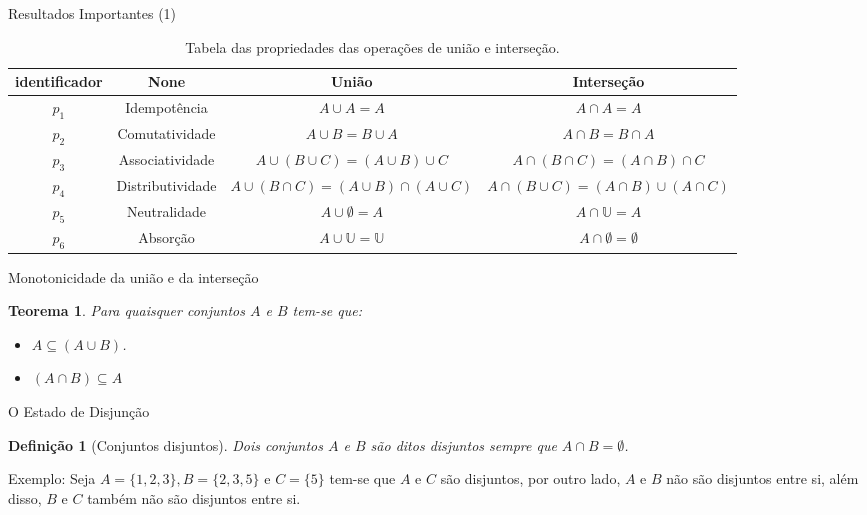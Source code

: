 \documentclass[aspectratio=169]{beamer}
\newtheorem{defi}{Definição}
\newtheorem{teo}{Teorema}
\begin{document}
	\begin{frame}{Resultados Importantes (1)}
		\begin{table}[h]
			\centering
			\scriptsize
			\begin{tabular}{cccc}
				\hline
				identificador & None & União & Interseção  \\
				\hline
				$p_1$ & Idempotência &  $A \cup A = A$ & $A \cap A = A$  \\
				$p_2$ & Comutatividade & $A \cup B = B \cup A$ & $A \cap B = B \cap A$ \\
				$p_3$ & Associatividade & $A \cup (B \cup C) = (A \cup B) \cup C$ & $A \cap (B \cap C) = (A \cap B) \cap C$ \\
				$p_4$ & Distributividade & $A \cup (B \cap C) = (A \cup B) \cap (A \cup C)$ & $A \cap (B \cup C) = (A \cap B) \cup (A \cap C)$\\
				$p_5$ & Neutralidade &  $A \cup \emptyset = A$ & $A \cap \mathbb{U} = A$ \\
				$p_6$ & Absorção & $A \cup \mathbb{U} = \mathbb{U}$ & $A \cap \emptyset = \emptyset$ \\
				\hline
			\end{tabular}
			\caption{Tabela das propriedades das operações de união e interseção.}
			\label{tab:PropriedadesUniaoIntersecao}
		\end{table}
	\end{frame}

	\begin{frame}{Monotonicidade da união e da interseção}
		\begin{teo}\label{teo:MonotonicidadeDaUniaoIntersecao}
			Para quaisquer conjuntos $A$ e $B$ tem-se que:
			\begin{itemize}
				\item[i.] $A \subseteq (A \cup B)$.
				\item[ii.] $(A \cap B) \subseteq A$
			\end{itemize}
		\end{teo}
	\end{frame}

	\begin{frame}{O Estado de Disjunção}
		\begin{defi}[Conjuntos disjuntos]\label{def:ConjuntosDisjuntos}
			Dois conjuntos $A$ e $B$ são ditos disjuntos sempre que $A \cap B = \emptyset$.
		\end{defi}
		\pause
		\begin{block}{Exemplo:}
			Seja $A = \{1, 2, 3\}, B = \{2, 3, 5\}$ e $C = \{5\}$ tem-se que $A$ e $C$ são disjuntos, por outro lado, $A$ e $B$ não são disjuntos entre si, além disso, $B$ e $C$ também não são disjuntos entre si.
		\end{block}
	\end{frame}
\end{document}
